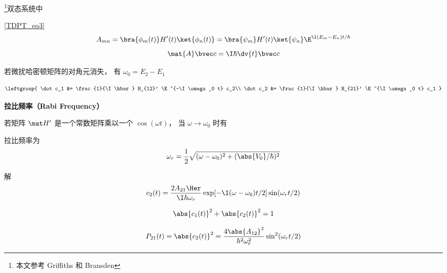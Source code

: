 
\begin{issues}
\issueDraft
\end{issues}

\footnote{本文参考 Griffiths 和 Bransden}双态系统中

\autoref{TDPT_eq3}~
\begin{equation}
A_{mn} = \bra{\phi_m(t)} H'(t) \ket{\phi_n(t)} = \bra{\psi_m} H'(t) \ket{\psi_n} \E^{\I(E_m-E_n)t/\hbar}
\end{equation}
\begin{equation}
\mat {A} \bvec c = \I\hbar \dv{t} \bvec c
\end{equation}

若微扰哈密顿矩阵的对角元消失， 有 $\omega_0 = E_2 - E_1$


\begin{equation}
\leftgroup{
\dot c_1 &= \frac{1}{\I \hbar} H_{12}' \E^{-\I\omega_0 t} c_2\\
\dot c_2 &= \frac{1}{\I \hbar} H_{21}' \E^{\I\omega_0 t} c_1
}\end{equation}

\textbf{拉比频率（Rabi Frequency）}

若矩阵 $\mat H'$ 是一个常数矩阵乘以一个 $\cos(\omega t)$， 当 $\omega \to \omega_0$ 时有


拉比频率为
\begin{equation}
\omega_r = \frac{1}{2} \sqrt{(\omega - \omega_0)^2 + (\abs{V_0}/\hbar)^2}
\end{equation}

解
\begin{equation}
c_2(t) = \frac{2A_{21}\Her}{\I \hbar \omega_r} \exp[-\I (\omega - \omega_0) t / 2] \sin(\omega_r t/2)
\end{equation}


\begin{equation}
\abs{c_1(t)}^2 + \abs{c_2(t)}^2 = 1
\end{equation}

\begin{equation}
P_{21}(t) = \abs{c_2(t)}^2 = \frac{4\abs{A_{12}}^2}{\hbar^2 \omega_r^2} \sin^2(\omega_r t/2)
\end{equation}
